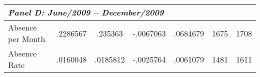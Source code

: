 {\begin{tabular}{l*{1}{cccccc}}

\multicolumn{6}{l}{{\it Panel D: June/2009 -- December/2009 }  } \\
\hline
Absence per Month   &    .2286567&     .235363&   -.0067063&    .0684679  &        1675&        1708\\
Absence Rate              &    .0160048&    .0185812&   -.0025764&    .0061079&        1481&        1611\\
\hline \hline


\end{tabular}
}
